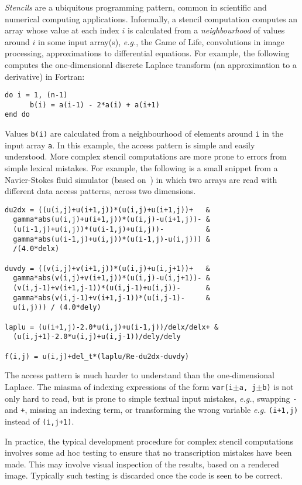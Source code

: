 \documentclass[10pt,preprint]{sigplanconf}
\theoremstyle{definition}
\newcommand{\eg}{\emph{e.g.}}
\begin{document}
\emph{Stencils} are a ubiquitous programming pattern, common in
scientific and numerical computing applications. Informally, a stencil
computation computes an array whose value at each index $i$ is
calculated from a \emph{neighbourhood} of values around $i$ in some
input array(s), \eg{}, the Game of Life, convolutions in image
processing, approximations to differential equations. For example, the
following computes the one-dimensional discrete Laplace transform (an
approximation to a derivative) in Fortran:
%
\begin{verbatim}
do i = 1, (n-1)
      b(i) = a(i-1) - 2*a(i) + a(i+1)
end do
\end{verbatim}
%
Values \texttt{b(i)} are calculated from a neighbourhood of elements
around \texttt{i} in the input array \texttt{a}.  In this example, the
access pattern is simple and easily understood. More complex
stencil computations are more prone to errors from simple lexical
mistakes. For example, the following is a small snippet from a
Navier-Stokes fluid simulator (based on~\citet{griebel1997numerical})
 in which two arrays are read with
different data access patterns, across two dimensions.
\begin{verbatim}
du2dx = ((u(i,j)+u(i+1,j))*(u(i,j)+u(i+1,j))+   &
  gamma*abs(u(i,j)+u(i+1,j))*(u(i,j)-u(i+1,j))- &
  (u(i-1,j)+u(i,j))*(u(i-1,j)+u(i,j))-          &
  gamma*abs(u(i-1,j)+u(i,j))*(u(i-1,j)-u(i,j))) &
  /(4.0*delx)

duvdy = ((v(i,j)+v(i+1,j))*(u(i,j)+u(i,j+1))+   &
  gamma*abs(v(i,j)+v(i+1,j))*(u(i,j)-u(i,j+1))- &
  (v(i,j-1)+v(i+1,j-1))*(u(i,j-1)+u(i,j))-      &
  gamma*abs(v(i,j-1)+v(i+1,j-1))*(u(i,j-1)-     &
  u(i,j))) / (4.0*dely)

laplu = (u(i+1,j)-2.0*u(i,j)+u(i-1,j))/delx/delx+ &
  (u(i,j+1)-2.0*u(i,j)+u(i,j-1))/dely/dely

f(i,j) = u(i,j)+del_t*(laplu/Re-du2dx-duvdy)
\end{verbatim}
The access pattern is much harder to understand than the
one-dimensional Laplace.  The miasma of indexing expressions of the
form \texttt{var(i$\pm$a, j$\pm$b)} is not only hard to read, but is
prone to simple textual input mistakes, \eg{}, swapping \texttt{-} and
\texttt{+}, missing an indexing term, or transforming the wrong
variable \eg{} \texttt{(i+1,j)} instead of \texttt{(i,j+1)}.

In practice, the typical development procedure for complex
stencil computations involves some ad hoc testing to ensure that no
transcription mistakes have been made. This may involve visual
inspection of the results, based on a rendered image. Typically such
testing is discarded once the code is seen to be correct.
\end{document}
